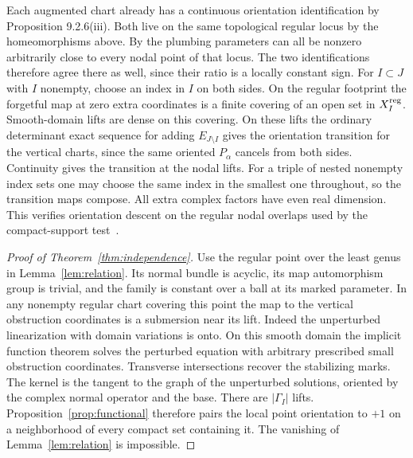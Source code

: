Each augmented chart already has a continuous orientation
identification by Proposition 9.2.6(iii). Both live on the same
topological regular locus by the homeomorphisms above. By \cite[\S B.12]{Atlas}
the plumbing parameters can all be nonzero arbitrarily close to
every nodal point of that locus. The two identifications therefore
agree there as well, since their ratio is a locally constant sign.
For $I\subset J$ with $I$ nonempty, choose an index in $I$ on both
sides. On the regular footprint the forgetful map at zero extra
coordinates is a finite covering of an open set in $X_I^{\rm reg}$.
Smooth-domain lifts are dense on this covering. On these lifts the
ordinary determinant exact sequence for adding $E_{J\setminus I}$
gives the orientation transition for the vertical charts, since
the same oriented $P_\alpha$ cancels from both sides. Continuity
gives the transition at the nodal lifts. For a triple of nested
nonempty index sets one may choose the same index in the smallest
one throughout, so the transition maps compose. All extra complex
factors have even real dimension. This verifies orientation descent
on the regular nodal overlaps used by the compact-support test~\cite[Proposition 9.2.6 and \S\S B.12--B.13]{Atlas}.

\begin{proof}[Proof of Theorem~\ref{thm:independence}]
Use the regular point over the least genus in Lemma~\ref{lem:relation}.
Its normal bundle is acyclic, its map automorphism group is trivial,
and the family is constant over a ball at its marked parameter.
In any nonempty regular chart covering this point the map to the
vertical obstruction coordinates is a submersion near its lift.
Indeed the unperturbed linearization with domain variations is onto.
On this smooth domain the implicit function theorem solves the perturbed
equation with arbitrary prescribed small obstruction coordinates.
Transverse intersections recover the stabilizing marks. The kernel
is the tangent to the graph of the unperturbed solutions, oriented
by the complex normal operator and the base. There are $|\Gamma_I|$
lifts. Proposition~\ref{prop:functional} therefore pairs the local
point orientation to $+1$ on a neighborhood of every compact set
containing it. The vanishing of Lemma~\ref{lem:relation} is impossible.
\end{proof}
